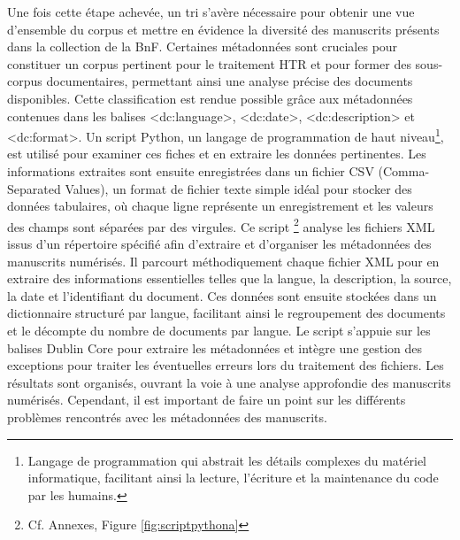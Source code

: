 \documentclass[a4paper,12pt,twoside]{book}
\begin{document}
	Une fois cette étape achevée, un tri s'avère nécessaire pour obtenir une vue d'ensemble du corpus et mettre en évidence la diversité des manuscrits présents dans la collection de la BnF. Certaines métadonnées sont cruciales pour constituer un corpus pertinent pour le traitement HTR et pour former des sous-corpus documentaires, permettant ainsi une analyse précise des documents disponibles. Cette classification est rendue possible grâce aux métadonnées contenues dans les balises <dc:language>, <dc:date>, <dc:description> et <dc:format>. Un script Python, un langage de programmation de haut niveau\footnote{ Langage de programmation qui abstrait les détails complexes du matériel informatique, facilitant ainsi la lecture, l'écriture et la maintenance du code par les humains.}, est utilisé pour examiner ces fiches et en extraire les données pertinentes. Les informations extraites sont ensuite enregistrées dans un fichier CSV (Comma-Separated Values), un format de fichier texte simple idéal pour stocker des données tabulaires, où chaque ligne représente un enregistrement et les valeurs des champs sont séparées par des virgules. Ce script \footnote{Cf. Annexes, Figure \ref{fig:scriptpythona}} analyse les fichiers XML issus d'un répertoire spécifié afin d'extraire et d'organiser les métadonnées des manuscrits numérisés. Il parcourt méthodiquement chaque fichier XML pour en extraire des informations essentielles telles que la langue, la description, la source, la date et l'identifiant du document. Ces données sont ensuite stockées dans un dictionnaire structuré par langue, facilitant ainsi le regroupement des documents et le décompte du nombre de documents par langue. Le script s'appuie sur les balises Dublin Core pour extraire les métadonnées et intègre une gestion des exceptions pour traiter les éventuelles erreurs lors du traitement des fichiers. Les résultats sont organisés, ouvrant la voie à une analyse approfondie des manuscrits numérisés. Cependant, il est important de faire un point sur les différents problèmes rencontrés avec les métadonnées des manuscrits. 
	\\
	
\end{document}
